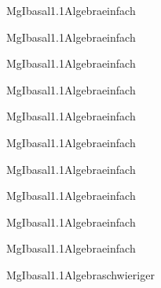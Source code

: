 \documentclass[12pt]{article}
\begin{document}
\begin{Add}{MgI}{basal1.1}{Algebra}{einfach}
\end{Add}

\begin{Add}{MgI}{basal1.1}{Algebra}{einfach}
\end{Add}

\begin{Add}{MgI}{basal1.1}{Algebra}{einfach}
\end{Add}

\begin{Add}{MgI}{basal1.1}{Algebra}{einfach}
\end{Add}

\begin{Add}{MgI}{basal1.1}{Algebra}{einfach}
\end{Add}

\begin{Add}{MgI}{basal1.1}{Algebra}{einfach}
\end{Add}

\begin{Add}{MgI}{basal1.1}{Algebra}{einfach}
\end{Add}

\begin{Add}{MgI}{basal1.1}{Algebra}{einfach}
\end{Add}

\begin{Add}{MgI}{basal1.1}{Algebra}{einfach}
\end{Add}

\begin{Add}{MgI}{basal1.1}{Algebra}{einfach}
\end{Add}

\begin{Add}{MgI}{basal1.1}{Algebra}{schwieriger}
\end{Add}
\end{document}
